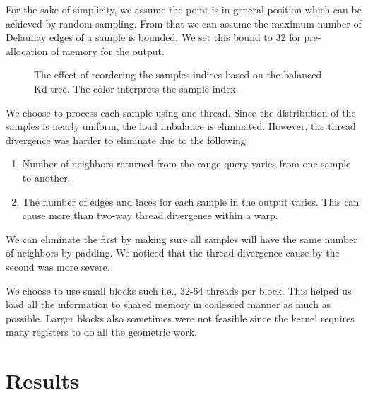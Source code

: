 \documentclass[12pt] {article}
\begin{document}
For the sake of simplicity, we assume the point is in general position which can be achieved by random sampling. From that we can assume the maximum number of Delaunay edges of a sample is bounded. We set this bound to 32 for pre-allocation of memory for the output. 

\begin{figure}[!tbh]
\centering        
   \caption{The effect of reordering the samples indices based on the balanced Kd-tree. The color interprets the sample index.}
   \label{fig:tree}
\end{figure}


We choose to process each sample using one thread. Since the distribution of the samples is nearly uniform, the load imbalance is eliminated. However, the thread divergence was harder to eliminate due to the following 
\begin{enumerate}
\item Number of neighbors returned from the range query varies from one sample to another. 
\item The number of edges and faces for each sample in the output varies. This can cause more than two-way thread divergence within a warp. 
\end{enumerate}

We can eliminate the first by making sure all samples will have the same number of neighbors by padding. We noticed that the thread divergence cause by the second was more severe. 

We choose to use small blocks such i.e., 32-64 threads per block. This helped us load all the information to shared memory in coalesced manner as much as possible. Larger blocks also sometimes were not feasible since the kernel requires many registers to do all the geometric work. 

\section*{Results}



\end{document}

